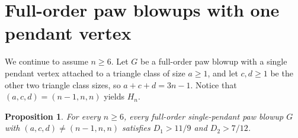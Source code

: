 \documentclass[10pt]{article}
\newtheorem{proposition}[theorem]{Proposition}
\begin{document}
\section{Full-order paw blowups with one pendant vertex}\label{sec:paw}

We continue to assume $n \geq 6$. Let $G$ be a full-order paw blowup with a single pendant vertex attached to a triangle class of size $a \geq 1$, and let $c, d \geq 1$ be the other two triangle class sizes, so $a + c + d = 3n - 1$. Notice that $(a, c, d) = (n - 1, n, n)$ yields $H_n$.

\begin{proposition}\label{prop:paw}
For every $n \geq 6$, every full-order single-pendant paw blowup $G$ with $(a, c, d) \neq (n - 1, n, n)$ satisfies $D_1 > 11/9$ and $D_2 > 7/12$.
\end{proposition}
\end{document}

